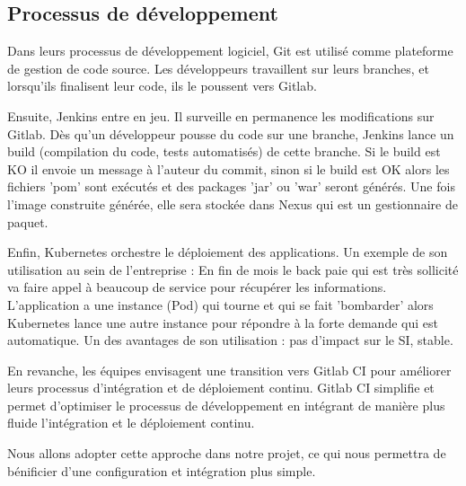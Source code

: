         \subsection{Processus de développement} 
        Dans leurs processus de développement logiciel, Git est utilisé comme plateforme de gestion de code source. Les développeurs travaillent sur leurs branches, et lorsqu’ils finalisent leur code, ils le poussent vers Gitlab.
        \medskip

	    Ensuite, Jenkins entre en jeu. Il surveille en permanence les modifications sur Gitlab. Dès qu’un développeur pousse du code sur une branche, Jenkins lance un build (compilation du code, tests automatisés) de cette branche. Si le build est KO il envoie un message à l’auteur du commit, sinon si le build est OK alors les fichiers 'pom' sont exécutés et des packages 'jar' ou 'war' seront générés. Une fois l’image construite générée, elle sera stockée dans Nexus qui est un gestionnaire de paquet.
        \medskip

	    Enfin, Kubernetes orchestre le déploiement des applications. Un exemple de son utilisation au sein de l’entreprise : En fin de mois le back paie qui est très sollicité va faire appel à beaucoup de service pour récupérer les informations. L’application a une instance (Pod) qui tourne et qui se fait 'bombarder' alors Kubernetes lance une autre instance pour répondre à la forte demande qui est automatique. Un des avantages de son utilisation : pas d’impact sur le SI, stable. 
        \medskip

        En revanche, les équipes envisagent une transition vers Gitlab CI pour améliorer leurs processus d'intégration et de déploiement continu.
        Gitlab CI simplifie et permet d'optimiser le processus de développement en intégrant de manière plus fluide l'intégration et le déploiement continu.\medskip

        Nous allons adopter cette approche dans notre projet, ce qui nous permettra de bénificier d'une configuration et intégration plus simple.
        
